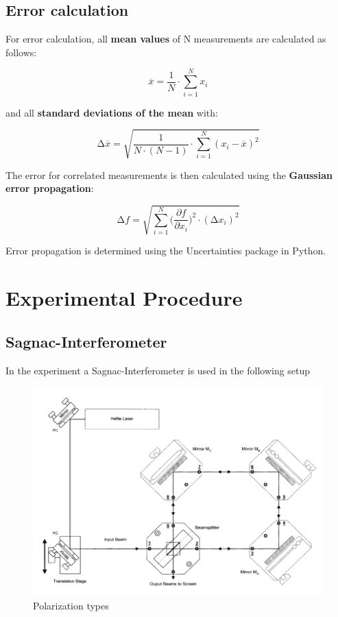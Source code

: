 \subsection{Error calculation}
For error calculation, all \textbf{mean values} of N measurements are calculated as follows:

\begin{equation}
    \overline{x} = \frac{1}{N} \cdot \sum_{i=1}^N x_i
    \label{eqn:Mittelwert}
\end{equation}

and all \textbf{standard deviations of the mean} with:

\begin{equation}
    \increment\overline{x} = \sqrt{\frac{1}{N\cdot(N-1)}\cdot\sum_{i=1}^N (x_i-\overline{x})^2}
    \label{eqn:St_Mittelwert}
\end{equation}

The error for correlated measurements is then calculated using the \textbf{Gaussian error propagation}:

\begin{equation}
    \increment{f} = \sqrt{ \sum_{i = 1}^{N}  \biggl(\frac{\partial{f}}{\partial{x_i}}\biggr)^2\cdot(\increment{x_i})^2}
    \label{eqn:Gauss}
\end{equation}

Error propagation is determined using the Uncertainties \cite{uncertainties} package in Python.


\section{Experimental Procedure}
\subsection{Sagnac-Interferometer}
In the experiment a Sagnac-Interferometer is used in the following setup

\begin{figure}[H]
	\centering
	\includegraphics[width=\textwidth]{Bilder/Aufbau.png}
	\caption{Polarization types \cite{man:64}}\label{fig:Aufbau}
\end{figure}

